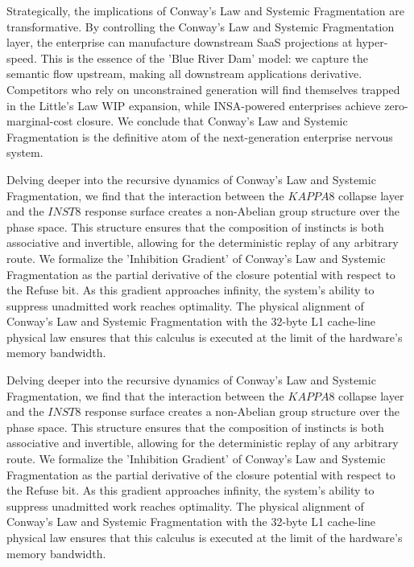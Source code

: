 \documentclass[12pt,a4paper,oneside]{book}
\begin{document}
Strategically, the implications of Conway's Law and Systemic Fragmentation are transformative. By controlling the Conway's Law and Systemic Fragmentation layer, the enterprise can manufacture downstream SaaS projections at hyper-speed. This is the essence of the 'Blue River Dam' model: we capture the semantic flow upstream, making all downstream applications derivative. Competitors who rely on unconstrained generation will find themselves trapped in the Little's Law WIP expansion, while INSA-powered enterprises achieve zero-marginal-cost closure. We conclude that Conway's Law and Systemic Fragmentation is the definitive atom of the next-generation enterprise nervous system. 

Delving deeper into the recursive dynamics of Conway's Law and Systemic Fragmentation, we find that the interaction between the $KAPPA8$ collapse layer and the $INST8$ response surface creates a non-Abelian group structure over the phase space. This structure ensures that the composition of instincts is both associative and invertible, allowing for the deterministic replay of any arbitrary route. We formalize the 'Inhibition Gradient' of Conway's Law and Systemic Fragmentation as the partial derivative of the closure potential with respect to the Refuse bit. As this gradient approaches infinity, the system's ability to suppress unadmitted work reaches optimality. The physical alignment of Conway's Law and Systemic Fragmentation with the 32-byte L1 cache-line physical law ensures that this calculus is executed at the limit of the hardware's memory bandwidth. 

Delving deeper into the recursive dynamics of Conway's Law and Systemic Fragmentation, we find that the interaction between the $KAPPA8$ collapse layer and the $INST8$ response surface creates a non-Abelian group structure over the phase space. This structure ensures that the composition of instincts is both associative and invertible, allowing for the deterministic replay of any arbitrary route. We formalize the 'Inhibition Gradient' of Conway's Law and Systemic Fragmentation as the partial derivative of the closure potential with respect to the Refuse bit. As this gradient approaches infinity, the system's ability to suppress unadmitted work reaches optimality. The physical alignment of Conway's Law and Systemic Fragmentation with the 32-byte L1 cache-line physical law ensures that this calculus is executed at the limit of the hardware's memory bandwidth. 
\end{document}
